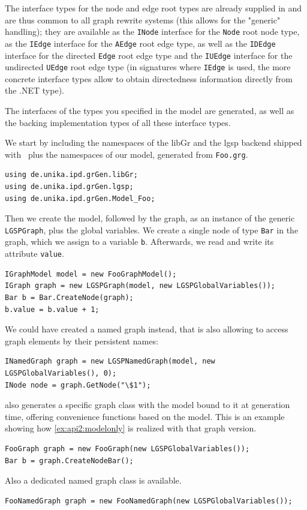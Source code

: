 The interface types for the node and edge root types are already supplied in \LibGr{} and are thus common to all graph rewrite systems (this allows for the "generic" handling); 
they are available as the \texttt{INode} interface for the \texttt{Node} root node type, 
as the \texttt{IEdge} interface for the \texttt{AEdge} root edge type, 
as well as the \texttt{IDEdge} interface for the directed \texttt{Edge} root edge type and the \texttt{IUEdge} interface for the undirected \texttt{UEdge} root edge type 
(in signatures where \texttt{IEdge} is used, the more concrete interface types allow to obtain directedness information directly from the .NET type).

The interfaces of the types you specified in the model are generated, as well as the backing implementation types of all these interface types.

\begin{example}\label{ex:api2:modelonly}
We start by including the namespaces of the libGr and the lgsp backend shipped with \GrG\,
plus the namespaces of our model, generated from \texttt{Foo.grg}.
\begin{verbatim}
using de.unika.ipd.grGen.libGr;
using de.unika.ipd.grGen.lgsp;
using de.unika.ipd.grGen.Model_Foo;
\end{verbatim}

Then we create the model, followed by the graph, as an instance of the generic \texttt{LGSPGraph}, plus the global variables.
We create a single node of type \texttt{Bar} in the graph, which we assign to a variable \texttt{b}.
Afterwards, we read and write its attribute \texttt{value}.
\begin{verbatim}
IGraphModel model = new FooGraphModel();
IGraph graph = new LGSPGraph(model, new LGSPGlobalVariables());
Bar b = Bar.CreateNode(graph);
b.value = b.value + 1;
\end{verbatim}

We could have created a named graph instead, that is also allowing to access graph elements by their persistent names:
\begin{verbatim}
INamedGraph graph = new LGSPNamedGraph(model, new LGSPGlobalVariables(), 0);
INode node = graph.GetNode("\$1");
\end{verbatim}
\end{example}

\begin{example}\label{ex:api1:modelonly}
\GrG{} also generates a specific graph class with the model bound to it at generation time, offering convenience functions based on the model.
This is an example showing how \ref{ex:api2:modelonly} is realized with that graph version.

\begin{verbatim}
FooGraph graph = new FooGraph(new LGSPGlobalVariables());
Bar b = graph.CreateNodeBar();
\end{verbatim}

Also a dedicated named graph class is available.
\begin{verbatim}
FooNamedGraph graph = new FooNamedGraph(new LGSPGlobalVariables());
\end{verbatim}
\end{example}

